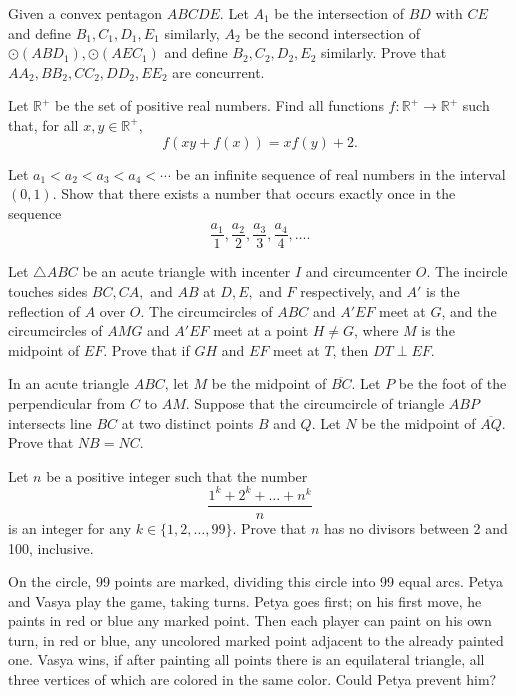 \documentclass[11pt]{scrartcl}
\begin{document}
\begin{problem}[651308339506337942]
Given a convex pentagon $ ABCDE. $ Let $ A_1 $ be the intersection of $ BD $ with $ CE $ and define $ B_1, C_1, D_1, E_1 $ similarly, $ A_2 $ be the second intersection of $ \odot (ABD_1),\odot (AEC_1) $ and define $ B_2, C_2, D_2, E_2 $ similarly. Prove that $ AA_2, BB_2, CC_2, DD_2, EE_2 $ are concurrent.
\end{problem}
\begin{problem}[437645166165639]
Let $\mathbb{R}^+$ be the set of positive real numbers. Find all functions $f \colon \mathbb{R}^+ \to \mathbb{R}^+$ such that, for all $x,y \in \mathbb{R}^+$,
$$f(xy+f(x))=xf(y)+2.$$
\end{problem}
\begin{problem}[8048961544243923335]
Let $a_1<a_2<a_3<a_4<\cdots$ be an infinite sequence of real numbers in the interval $(0,1)$. Show that there exists a number that occurs exactly once in the sequence
\[ \frac{a_1}{1},\frac{a_2}{2},\frac{a_3}{3},\frac{a_4}{4},\ldots.\]
\end{problem}
\begin{problem}[456772085666528]
Let $\triangle ABC$ be an acute triangle with incenter $I$ and circumcenter $O$. The incircle touches sides $BC,CA,$ and $AB$ at $D,E,$ and $F$ respectively, and $A'$ is the reflection of $A$ over $O$. The circumcircles of $ABC$ and $A'EF$ meet at $G$, and the circumcircles of $AMG$ and $A'EF$ meet at a point $H\neq G$, where $M$ is the midpoint of $EF$. Prove that if $GH$ and $EF$ meet at $T$, then $DT\perp EF$.
\end{problem}
\begin{problem}[9137209985622350774]
	In an acute triangle $ABC$, let $M$ be the midpoint of $\overline{BC}$. Let $P$ be the foot of the perpendicular from $C$ to $AM$. Suppose that the circumcircle of triangle $ABP$ intersects line $BC$ at two distinct points $B$ and $Q$. Let $N$ be the midpoint of $\overline{AQ}$. Prove that $NB=NC$.
\end{problem}
\begin{problem}[4306507392377162131]
Let $n$ be a positive integer such that the number
\[\frac{1^k + 2^k + \dots + n^k}{n}\]is an integer for any $k \in \{1, 2, \dots, 99\}$. Prove that $n$ has no divisors between 2 and 100, inclusive.
\end{problem}
\begin{problem}[2117883853443241027]
On the circle, 99 points are marked, dividing this circle into 99 equal arcs. Petya and Vasya play the game, taking turns. Petya goes first; on his first move, he paints in red or blue any marked point. Then each player can paint on his own turn, in red or blue, any uncolored marked point adjacent to the already painted one. Vasya wins, if after painting all points there is an equilateral triangle, all three vertices of which are colored in the same color. Could Petya prevent him?
\end{problem}
\end{document}
